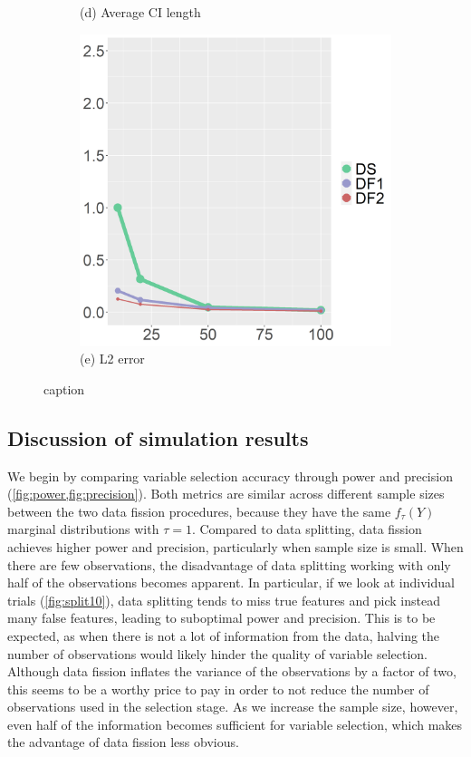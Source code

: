 \begin{figure}[ht!]
\begin{subfigure}[b]{.32\columnwidth}
    \caption{(d) Average CI length}
    \label{fig:ci}
\end{subfigure}
\hfill
\centering
\begin{subfigure}[b]{.32\columnwidth} 
    \includegraphics[width=\columnwidth]{../../plot/L2_1.png}
    \caption{(e) L2 error}
    \label{fig:l2}
\end{subfigure}
\hfill
\caption{caption}
\label{fig:median}
\end{figure}

\subsection{Discussion of simulation results}

We begin by comparing variable selection accuracy through power and precision (\cref{fig:power,fig:precision}). Both metrics are similar across different sample sizes between the two data fission procedures, because they have the same $f_\tau(Y)$ marginal distributions with $\tau=1$. Compared to data splitting, data fission achieves higher power and precision, particularly when sample size is small. When there are few observations, the disadvantage of data splitting working with only half of the observations becomes apparent. In particular, if we look at individual trials (\cref{fig:split10}), data splitting tends to miss true features and pick instead many false features, leading to suboptimal power and precision. This is to be expected, as when there is not a lot of information from the data, halving the number of observations would likely hinder the quality of variable selection. Although data fission inflates the variance of the observations by a factor of two, this seems to be a worthy price to pay in order to not reduce the number of observations used in the selection stage. As we increase the sample size, however, even half of the information becomes sufficient for variable selection, which makes the advantage of data fission less obvious.

